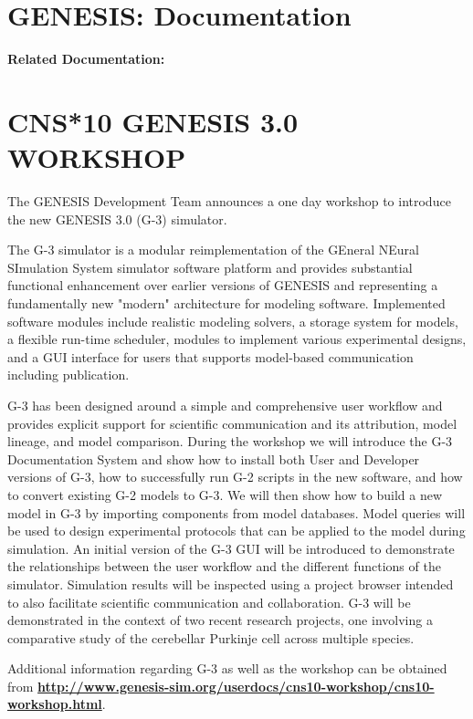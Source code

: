 \documentclass[12pt]{article}
\begin{document}
\section*{GENESIS: Documentation}

{\bf Related Documentation:}

\section*{CNS*10 GENESIS 3.0 WORKSHOP}

The GENESIS Development Team announces a one day workshop to introduce the new GENESIS 3.0 (G-3) simulator.

The G-3 simulator is a modular reimplementation of the GEneral NEural SImulation System simulator software platform and provides substantial functional enhancement over earlier versions of GENESIS and representing a fundamentally new "modern" architecture for modeling software. Implemented software modules include realistic modeling solvers, a storage system for models, a flexible run-time scheduler, modules to implement various experimental designs, and a GUI interface for users that supports model-based communication including publication.

G-3 has been designed around a simple and comprehensive user workflow and provides explicit support for scientific communication and its attribution, model lineage, and model comparison. During the workshop we will introduce the G-3 Documentation System and show how to install both User and Developer versions of G-3, how to successfully run G-2 scripts in the new software, and how to convert existing G-2 models to G-3. We will then show how to build a new model in G-3 by importing components from model databases. Model queries will be used to design experimental protocols that can be applied to the model during simulation. An initial version of the G-3 GUI will be introduced to demonstrate the relationships between the user workflow and the different functions of the simulator. Simulation results will be inspected using a project browser intended to also facilitate scientific communication and collaboration. G-3 will be demonstrated in the context of two recent research projects, one involving a comparative study of the cerebellar Purkinje cell across multiple species.

Additional information regarding G-3 as well as the workshop can be obtained from \href{http://www.genesis-sim.org/userdocs/cns10-workshop/cns10-workshop.html}{\bf http://www.genesis-sim.org/userdocs/cns10-workshop/cns10-workshop.html}.
\end{document}
